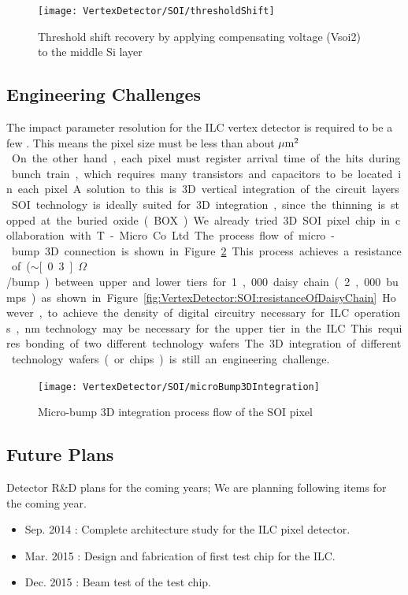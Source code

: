 \begin{figure}
\centering
\texttt{[image: VertexDetector/SOI/thresholdShift]}
\caption{Threshold shift recovery by applying compensating voltage (Vsoi2) to the middle Si layer}
\label{fig:VertexDetector:SOI:thresholdShift}
\end{figure}

\subsection{Engineering Challenges}
The impact parameter resolution for the ILC vertex detector is required to be a few \micron. This means the pixel size must be less than about \unit[20]{$\mu\mathrm{m}^2$}. On the other hand, each pixel must register arrival time of the hits during bunch train, which requires many transistors and capacitors to be located in each pixel.
A solution to this is 3D vertical integration of the circuit layers. SOI technology is ideally suited for 3D integration, since the thinning is stopped at the buried oxide (BOX). We already tried 3D SOI pixel chip in collaboration with T-Micro Co. Ltd. The process flow of micro-bump 3D connection is shown in Figure~\ref{fig:VertexDetector:SOI:microbump3D}. This process achieves a resistance of ($\sim$\unit[0.3]{$\Omega$}/bump) between upper and lower tiers for 1,000 daisy chain (2,000 bumps) as shown in Figure~\ref{fig:VertexDetector:SOI:resistanceOfDaisyChain}.
However, to achieve the density of digital circuitry necessary for ILC operations, \unit[32]{nm} technology may be necessary for the upper tier in the ILC. This requires bonding of two different technology wafers. The 3D integration of different technology wafers (or chips) is still an engineering challenge.

\begin{figure}
\centering     \texttt{[image: VertexDetector/SOI/microBump3DIntegration]}
\caption{Micro-bump 3D integration process flow of the SOI pixel}
\label{fig:VertexDetector:SOI:microbump3D}
 \end{figure}

\subsection{Future Plans}
Detector R\&D plans for the coming years;
We are planning following items for the coming year.
\begin{itemize}
\item Sep. 2014 : Complete architecture study for the ILC pixel detector.
\item Mar. 2015 : Design and fabrication of first test chip for the ILC.
\item Dec. 2015 : Beam test of the test chip.
\end{itemize}
